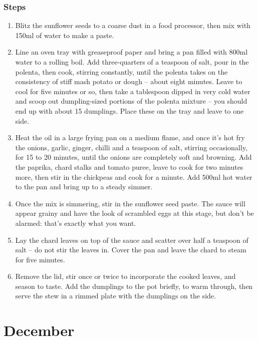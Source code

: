 \documentclass{book}
\begin{document}
\subsection*{Steps}
\begin{enumerate}
\item Blitz the sunflower seeds to a coarse dust in a food processor, then mix with 150ml of water to make a paste.
\item Line an oven tray with greaseproof paper and bring a pan filled with 800ml water to a rolling boil. Add three-quarters of a teaspoon of salt, pour in the polenta, then cook, stirring constantly, until the polenta takes on the consistency of stiff mash potato or dough – about eight minutes. Leave to cool for five minutes or so, then take a tablespoon dipped in very cold water and scoop out dumpling-sized portions of the polenta mixture – you should end up with about 15 dumplings. Place these on the tray and leave to one side.
\item Heat the oil in a large frying pan on a medium flame, and once it’s hot fry the onions, garlic, ginger, chilli and a teaspoon of salt, stirring occasionally, for 15 to 20 minutes, until the onions are completely soft and browning. Add the paprika, chard stalks and tomato puree, leave to cook for two minutes more, then stir in the chickpeas and cook for a minute. Add 500ml hot water to the pan and bring up to a steady simmer.
\item Once the mix is simmering, stir in the sunflower seed paste. The sauce will appear grainy and have the look of scrambled eggs at this stage, but don’t be alarmed: that’s exactly what you want.
\item Lay the chard leaves on top of the sauce and scatter over half a teaspoon of salt – do not stir the leaves in. Cover the pan and leave the chard to steam for five minutes.
\item Remove the lid, stir once or twice to incorporate the cooked leaves, and season to taste. Add the dumplings to the pot briefly, to warm through, then serve the stew in a rimmed plate with the dumplings on the side.
\end{enumerate}
\newpage

\chapter{December}
\end{document}
